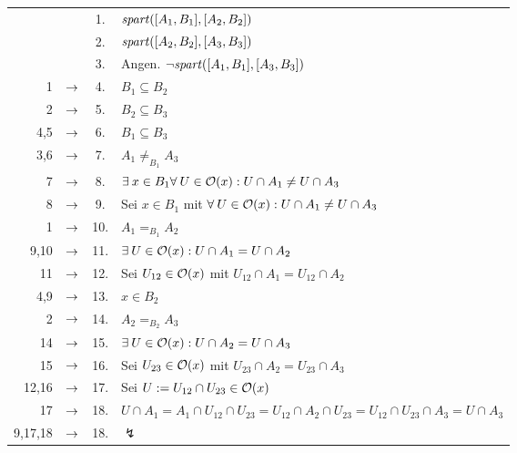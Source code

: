 \begin{longtable}{r c c l}
    & & 1. & $\mathit{spart}([A_1,B_1],[A_2,B_2])$ \\
    & & 2. & $\mathit{spart}([A_2,B_2],[A_3,B_3])$ \\
    & & 3. & Angen. $\neg \mathit{spart}([A_1,B_1],[A_3,B_3])$ \\
    1 & $\rightarrow$ & 4. & $B_1 \subseteq B_2$ \\
    2 & $\rightarrow$ & 5. & $B_2 \subseteq B_3$ \\
    4,5 & $\rightarrow$ & 6. & $B_1 \subseteq B_3$ \\
    3,6 & $\rightarrow$ & 7. & $A_1 \neq_{B_1} A_3$ \\
    7 & $\rightarrow$ & 8. & $\exists\: x \in B_1 \forall\: U \in \mathcal{O}(x): U \cap A_1 \neq U \cap A_3$\\
    8 & $\rightarrow$ & 9. & Sei $x \in B_1$ mit $\forall\: U \in \mathcal{O}(x): U \cap A_1 \neq U \cap A_3$ \\
    1 & $\rightarrow$ & 10. & $A_1 =_{B_1} A_2$ \\
    9,10 & $\rightarrow$ & 11. & $\exists\: U \in \mathcal{O}(x): U \cap A_1 = U \cap A_2$ \\
    11 & $\rightarrow$ & 12. & Sei $U_{12} \in \mathcal{O}(x)$ mit $U_{12} \cap A_1 = U_{12} \cap A_2$  \\
    4,9 & $\rightarrow$ & 13. & $x \in B_2$ \\
    2 & $\rightarrow$ & 14. & $A_2 =_{B_2} A_3$ \\
    14 & $\rightarrow$ & 15. & $\exists\: U \in \mathcal{O}(x): U \cap A_2 = U \cap A_3$ \\
    15 & $\rightarrow$ & 16. & Sei $U_{23} \in \mathcal{O}(x)$ mit $U_{23} \cap A_2 = U_{23} \cap A_3$ \\
    12,16 & $\rightarrow$ & 17. & Sei $U := U_{12} \cap U_{23} \in \mathcal{O}(x)$ \\
    17 & $\rightarrow$ & 18. & $U \cap A_1 = A_1 \cap U_{12} \cap U_{23} = U_{12} \cap A_2 \cap U_{23} = U_{12} \cap U_{23} \cap A_3 = U \cap A_3$ \\
    9,17,18 & $\rightarrow$ & 18. & $\lightning$
\end{longtable}	
